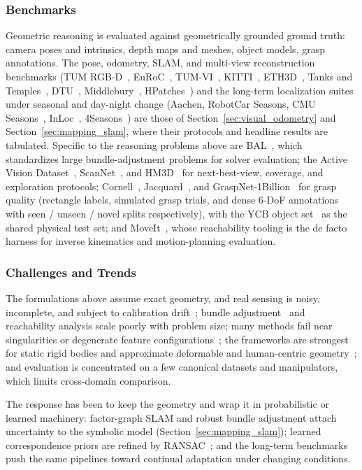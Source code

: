 \subsubsection{Benchmarks}
Geometric reasoning is evaluated against geometrically grounded ground truth: camera poses and intrinsics, depth maps and meshes, object models, grasp annotations. The pose, odometry, SLAM, and multi-view reconstruction benchmarks (TUM RGB-D~\cite{Sturm2012TUMRGBD}, EuRoC~\cite{Burri2016EuRoC}, TUM-VI~\cite{Schubert2018TUMVI}, KITTI~\cite{KITTI-GeigerLU12}, ETH3D~\cite{Schoeps2017ETH3D}, Tanks and Temples~\cite{knapitsch2017tanks}, DTU~\cite{Aanaes2016DTU}, Middlebury~\cite{Seitz2006Middlebury,Scharstein2002Stereo}, HPatches~\cite{Balntas2017HPatches}) and the long-term localization suites under seasonal and day-night change (Aachen, RobotCar Seasons, CMU Seasons~\cite{Sattler2018Benchmarking}, InLoc~\cite{Taira2018InLoc}, 4Seasons~\cite{wenzel2021seasons}) are those of Section~\ref{sec:visual_odometry} and Section~\ref{sec:mapping_slam}, where their protocols and headline results are tabulated. Specific to the reasoning problems above are BAL~\cite{agarwal2010bundle}, which standardizes large bundle-adjustment problems for solver evaluation; the Active Vision Dataset~\cite{Johns2016AVD}, ScanNet~\cite{dai2017scannet}, and HM3D~\cite{Ramakrishnan2021HM3D} for next-best-view, coverage, and exploration protocols; Cornell~\cite{Jiang2011Cornell}, Jacquard~\cite{Depierre2018Jacquard}, and GraspNet-1Billion~\cite{Fang2020GraspNet} for grasp quality (rectangle labels, simulated grasp trials, and dense 6-DoF annotations with seen / unseen / novel splits respectively), with the YCB object set~\cite{Calli2015YCB} as the shared physical test set; and MoveIt~\cite{Cohen2012MoveIt}, whose reachability tooling is the de facto harness for inverse kinematics and motion-planning evaluation.

\subsubsection{Challenges and Trends}
The formulations above assume exact geometry, and real sensing is noisy, incomplete, and subject to calibration drift~\cite{Sturm2012TUMRGBD,Burri2016EuRoC}; bundle adjustment~\cite{agarwal2010bundle} and reachability analysis scale poorly with problem size; many methods fail near singularities or degenerate feature configurations~\cite{Nakamura1986IKSingularity,Hartley1997EightPoint}; the frameworks are strongest for static rigid bodies and approximate deformable and human-centric geometry~\cite{SicilianoKhatib2016}; and evaluation is concentrated on a few canonical datasets and manipulators, which limits cross-domain comparison.

The response has been to keep the geometry and wrap it in probabilistic or learned machinery: factor-graph SLAM and robust bundle adjustment attach uncertainty to the symbolic model (Section~\ref{sec:mapping_slam}); learned correspondence priors are refined by RANSAC~\cite{Fischler1981RANSAC}; and the long-term benchmarks~\cite{wenzel2021seasons,Sattler2018Benchmarking} push the same pipelines toward continual adaptation under changing conditions.
